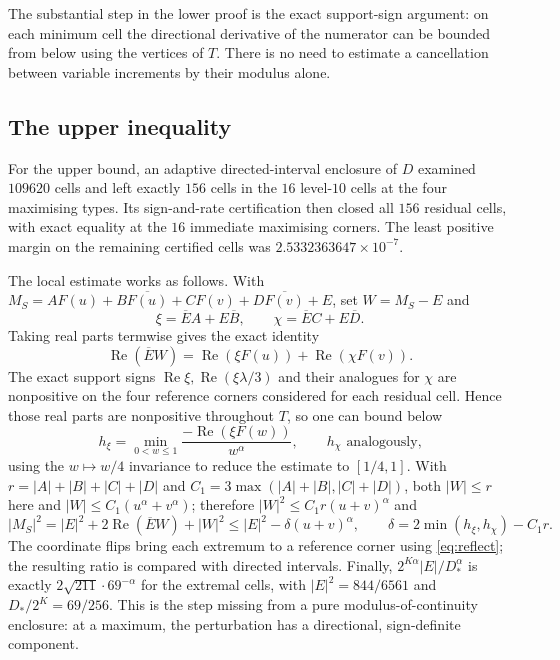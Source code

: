 \documentclass[11pt]{article}
\theoremstyle{remark}
\begin{document}
The substantial step in the lower proof is the exact support-sign argument: on each minimum cell
the directional derivative of the numerator can be bounded from below using the vertices of $T$.
There is no need to estimate a cancellation between variable increments by their modulus alone.

\subsection{The upper inequality}
For the upper bound, an adaptive directed-interval enclosure of $D$ examined $109620$ cells and
left exactly $156$ cells in the $16$ level-$10$ cells at the four maximising types. Its sign-and-rate
certification then closed all $156$ residual cells, with exact equality at the $16$ immediate
maximising corners. The least positive margin on the remaining certified cells was
$2.5332363647\times10^{-7}$.

The local estimate works as follows. With $M_S=A F(u)+B\overline{F(u)}+C F(v)+D\overline{F(v)}+E$,
set $W=M_S-E$ and
\[
  \xi=\overline E A+E\overline B,\qquad \chi=\overline E C+E\overline D.
\]
Taking real parts termwise gives the exact identity
\begin{equation}\label{eq:split}
  \operatorname{Re}(\overline E W)=\operatorname{Re}(\xi F(u))+\operatorname{Re}(\chi F(v)).
\end{equation}
The exact support signs $\operatorname{Re}\xi,\operatorname{Re}(\xi\lambda/3)$ and their analogues
for $\chi$ are nonpositive on the four reference corners considered for each residual cell. Hence
those real parts are nonpositive throughout $T$, so one can bound below
\begin{equation}\label{eq:h}
  h_\xi=\min_{0<w\le1}\frac{-\operatorname{Re}(\xi F(w))}{w^{\alpha}},\qquad h_\chi
  \text{ analogously,}
\end{equation}
using the $w\mapsto w/4$ invariance to reduce the estimate to $[1/4,1]$. With
$r=|A|+|B|+|C|+|D|$ and $C_1=3\max(|A|+|B|,|C|+|D|)$, both $|W|\le r$ here and
$|W|\le C_1(u^{\alpha}+v^{\alpha})$; therefore $|W|^2\le C_1r(u+v)^{\alpha}$ and
\[
  |M_S|^2=|E|^2+2\operatorname{Re}(\overline E W)+|W|^2
  \le |E|^2-\delta(u+v)^{\alpha},\qquad
  \delta=2\min(h_\xi,h_\chi)-C_1r.
\]
The coordinate flips bring each extremum to a reference corner using \eqref{eq:reflect}; the
resulting ratio is compared with directed intervals. Finally, $2^{K\alpha}|E|/D_*^{\alpha}$ is
exactly $2\sqrt{211}\cdot69^{-\alpha}$ for the extremal cells, with
$|E|^2=844/6561$ and $D_*/2^K=69/256$. This is the step missing from a pure modulus-of-continuity
enclosure: at a maximum, the perturbation has a directional, sign-definite component.
\end{document}
